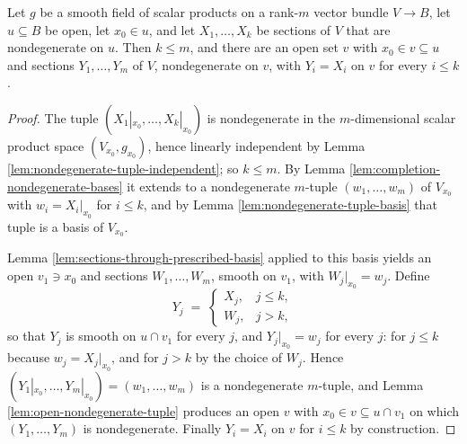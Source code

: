 \begin{lemma}
\label{lem:extend-nondegenerate-family}
\leanok
{}
Let $g$ be a smooth field of scalar products on a rank-$m$ vector bundle $V \to B$, let $u \subseteq B$ be open, let $x_0 \in u$, and let $X_1,\ldots,X_k$ be sections of $V$ that are nondegenerate on $u$. Then $k \leq m$, and there are an open set $v$ with $x_0 \in v \subseteq u$ and sections $Y_1,\ldots,Y_m$ of $V$, nondegenerate on $v$, with $Y_i = X_i$ on $v$ for every $i \leq k$.
\end{lemma}

\begin{proof}
\leanok
{}
The tuple $(X_1|_{x_0},\ldots,X_k|_{x_0})$ is nondegenerate in the $m$-dimensional scalar product space $(V_{x_0}, g_{x_0})$, hence linearly independent by Lemma \ref{lem:nondegenerate-tuple-independent}; so $k \leq m$. By Lemma \ref{lem:completion-nondegenerate-bases} it extends to a nondegenerate $m$-tuple $(w_1,\ldots,w_m)$ of $V_{x_0}$ with $w_i = X_i|_{x_0}$ for $i \leq k$, and by Lemma \ref{lem:nondegenerate-tuple-basis} that tuple is a basis of $V_{x_0}$.

Lemma \ref{lem:sections-through-prescribed-basis} applied to this basis yields an open $v_1 \ni x_0$ and sections $W_1,\ldots,W_m$, smooth on $v_1$, with $W_j|_{x_0} = w_j$. Define
\[
  Y_j \;=\; \begin{cases} X_j, & j \leq k,\\ W_j, & j > k,\end{cases}
\]
so that $Y_j$ is smooth on $u \cap v_1$ for every $j$, and $Y_j|_{x_0} = w_j$ for every $j$: for $j \leq k$ because $w_j = X_j|_{x_0}$, and for $j > k$ by the choice of $W_j$. Hence $(Y_1|_{x_0},\ldots,Y_m|_{x_0}) = (w_1,\ldots,w_m)$ is a nondegenerate $m$-tuple, and Lemma \ref{lem:open-nondegenerate-tuple} produces an open $v$ with $x_0 \in v \subseteq u \cap v_1$ on which $(Y_1,\ldots,Y_m)$ is nondegenerate. Finally $Y_i = X_i$ on $v$ for $i \leq k$ by construction.
\end{proof}

